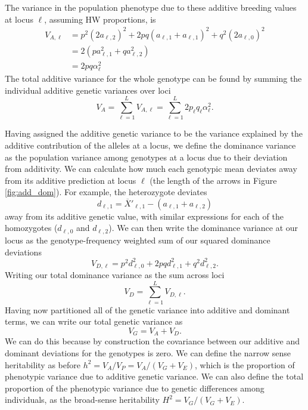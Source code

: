 The variance in the population phenotype due to these
additive breeding values at locus $\ell$, assuming HW proportions, is
\begin{align}
V_{A, \ell} &= p^2 (2a_{\ell,2})^2 + 2pq (a_{\ell,1}+a_{\ell,1})^2 + q^2
(2a_{\ell,0})^2 \nonumber \\
& = 2(p a_{\ell, 1}^2 + q a_{\ell, 2}^2 ) \nonumber \\
& = 2pq \alpha_{\ell}^2 \label{eqn:additive_var_additive_effect}
\end{align}
The total additive variance for the whole genotype can
be found by summing the individual additive genetic variances over loci
\begin{equation}
V_A = \sum_{\ell=1}^{L} V_{A, \ell} = \sum_{\ell=1}^{L}
2p_{\ell}q_{\ell} \alpha_{\ell}^2.
\end{equation}

Having assigned the additive genetic variance to be the variance
explained by the additive contribution of the alleles at a locus, we
define the dominance variance as the population variance among
genotypes at a locus due to their deviation from additivity.
We can calculate how much each genotypic mean deviates away from its
additive prediction at locus $\ell$ (the length of the arrows in
Figure \ref{fig:add_dom}). For example, the heterozygote deviates 
\begin{equation}
d_{\ell,1} =\overline{X}'_{\ell,1}  - (a_{\ell,1}+ a_{\ell,2})
\end{equation}
away from its additive genetic value, with similar expressions for
each of the homozygotes ($d_{\ell,0}$ and $d_{\ell,2}$). We can then write the dominance variance at
our locus as the genotype-frequency weighted sum of our squared
dominance deviations
\begin{equation}
V_{D,\ell} = p^2 d_{\ell,0}^2+ 2pq d_{\ell,1}^2+ q^2 d_{\ell,2}^2.
\end{equation}
Writing our total dominance variance as the sum across loci 
\begin{equation}
V_D = \sum_{\ell=1}^{L}  V_{D,\ell}. 
\end{equation}
Having now partitioned all of the genetic variance into additive and
dominant terms, we can write our total genetic variance as 
\begin{equation}
V_{G} = V_A+V_D.
\end{equation}
We can do this because by construction the covariance between our
additive and dominant deviations for the genotypes is zero. We can
define the narrow sense heritability as before
$h^2=V_A/V_P=V_A/(V_G+V_E)$, which is the proportion of phenotypic
variance due to additive genetic variance. We can also define the 
total proportion of the phenotypic variance due to genetic differences
among individuals, as the broad-sense heritability $H^2 =
V_G/(V_G+V_E)$. \\

